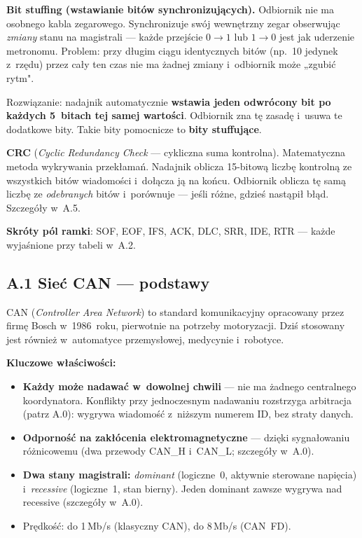 \documentclass[12pt,a4paper]{article}
\begin{document}
\medskip
\textbf{Bit stuffing (wstawianie bitów synchronizujących).}
Odbiornik nie ma osobnego kabla zegarowego. Synchronizuje swój wewnętrzny zegar
obserwując \emph{zmiany} stanu na magistrali — każde przejście $0\to1$ lub
$1\to0$ jest jak uderzenie metronomu. Problem: przy długim ciągu identycznych
bitów (np.\ 10 jedynek z~rzędu) przez cały ten czas nie ma żadnej zmiany
i~odbiornik może „zgubić rytm".

Rozwiązanie: nadajnik automatycznie \textbf{wstawia jeden odwrócony bit po
każdych 5~bitach tej samej wartości}. Odbiornik zna tę zasadę i~usuwa te
dodatkowe bity. Takie bity pomocnicze to \textbf{bity stuffujące}.

\medskip
\textbf{CRC} (\textit{Cyclic Redundancy Check} — cykliczna suma kontrolna).
Matematyczna metoda wykrywania przekłamań. Nadajnik oblicza 15-bitową liczbę
kontrolną ze wszystkich bitów wiadomości i~dołącza ją na końcu. Odbiornik
oblicza tę samą liczbę ze \emph{odebranych} bitów i~porównuje — jeśli różne,
gdzieś nastąpił błąd. Szczegóły w~A.5.

\medskip
\textbf{Skróty pól ramki}: SOF, EOF, IFS, ACK, DLC, SRR, IDE, RTR —
każde wyjaśnione przy tabeli w~A.2.

\subsection*{A.1 Sieć CAN — podstawy}

CAN (\textit{Controller Area Network}) to standard komunikacyjny opracowany przez
firmę Bosch w~1986~roku, pierwotnie na potrzeby motoryzacji. Dziś stosowany jest
również w~automatyce przemysłowej, medycynie i~robotyce.

\textbf{Kluczowe właściwości:}
\begin{itemize}
    \item \textbf{Każdy może nadawać w~dowolnej chwili} — nie ma żadnego
          centralnego koordynatora. Konflikty przy jednoczesnym nadawaniu
          rozstrzyga arbitracja (patrz A.0): wygrywa wiadomość z~niższym
          numerem ID, bez straty danych.
    \item \textbf{Odporność na zakłócenia elektromagnetyczne} — dzięki
          sygnałowaniu różnicowemu (dwa przewody CAN\_H i~CAN\_L;
          szczegóły w~A.0).
    \item \textbf{Dwa stany magistrali:} \textit{dominant} (logiczne~0,
          aktywnie sterowane napięcia) i~\textit{recessive} (logiczne~1,
          stan bierny). Jeden dominant zawsze wygrywa nad recessive
          (szczegóły w~A.0).
    \item Prędkość: do 1\,Mb/s (klasyczny CAN), do 8\,Mb/s (CAN~FD).
\end{itemize}
\end{document}
